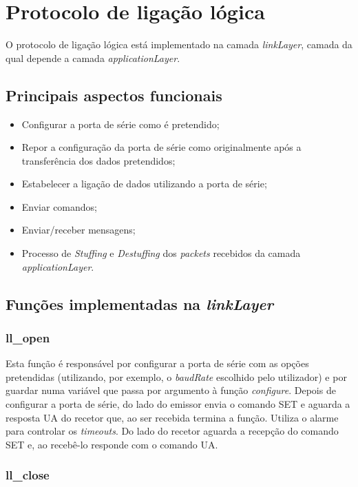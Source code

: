 \documentclass[11pt]{article}
\begin{document}
\newpage
\section{Protocolo de ligação lógica}

O protocolo de ligação lógica está implementado na camada \textit{linkLayer}, camada da qual depende a camada \textit{applicationLayer}.

\subsection{Principais aspectos funcionais}
\begin{itemize}
  \item Configurar a porta de série como é pretendido;
  \item Repor a configuração da porta de série como originalmente após a transferência dos dados pretendidos;
  \item  Estabelecer a ligação de dados utilizando a porta de série;
  \item  Enviar comandos;
  \item  Enviar/receber mensagens;
  \item Processo de \textit{Stuffing} e \textit{Destuffing} dos \textit{packets} recebidos da camada \textit{applicationLayer}.
\end{itemize}


\subsection{Funções implementadas na \textit{linkLayer}}
  
 \subsubsection{ll\_open}

	Esta função é responsável por configurar a porta de série com as opções pretendidas (utilizando, por exemplo, o \textit{baudRate} escolhido pelo utilizador) e por guardar numa variável que passa por argumento à função \textit{configure}.
	Depois de configurar a porta de série, do lado do emissor envia o comando SET e aguarda a resposta UA do recetor que, ao ser recebida termina a função. Utiliza o alarme para controlar os \textit{timeouts}. Do lado do recetor aguarda a recepção do comando SET e, ao recebê-lo responde com o comando UA.
   	
  \subsubsection{ll\_close}
   
\end{document}
